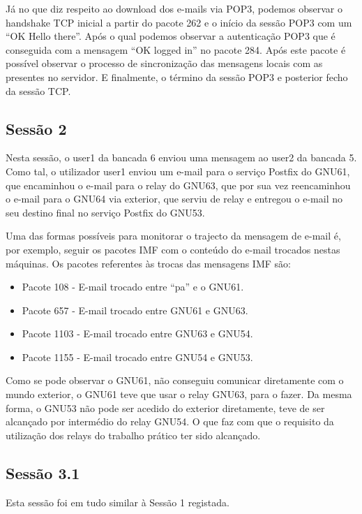 \documentclass[a4paper,12pt]{article}
\begin{document}
Já no que diz respeito ao download dos e-mails via POP3, podemos observar
o handshake TCP inicial a partir do pacote 262 e o início da sessão POP3
com um ``OK Hello there''. Após o qual podemos observar a autenticação
POP3 que é conseguida com a mensagem ``OK logged in'' no pacote 284. Após este
pacote é possível observar o processo de sincronização das mensagens
locais com as presentes no servidor. E finalmente, o término da sessão POP3
e posterior fecho da sessão TCP.

\subsection{Sessão 2}

Nesta sessão, o user1 da bancada 6 enviou uma mensagem ao user2 da bancada 5.
Como tal, o utilizador user1 enviou um e-mail para o serviço Postfix do
GNU61, que encaminhou o e-mail para o relay do GNU63,
que por sua vez reencaminhou o e-mail para o GNU64 via exterior, que serviu de relay
e entregou o e-mail no seu destino final no serviço Postfix do GNU53.

Uma das formas possíveis para monitorar o trajecto da mensagem de e-mail é,
por exemplo, seguir os pacotes IMF com o conteúdo do e-mail trocados nestas 
máquinas. Os pacotes referentes às trocas das mensagens IMF são:
\begin{itemize}
	\item Pacote 108 - E-mail trocado entre ``pa'' e o GNU61.
	\item Pacote 657 - E-mail trocado entre GNU61 e GNU63.
	\item Pacote 1103 - E-mail trocado entre GNU63 e GNU54.
	\item Pacote 1155 - E-mail trocado entre GNU54 e GNU53.
\end{itemize}

Como se pode observar o GNU61, não conseguiu comunicar diretamente com o mundo 
exterior, o GNU61 teve que usar o relay GNU63, para o fazer. Da mesma forma, o
GNU53 não pode ser acedido do exterior diretamente, teve de ser alcançado
por intermédio do relay GNU54. O que faz com que o requisito da utilização
dos relays do trabalho prático ter sido alcançado.

\subsection{Sessão 3.1}

Esta sessão foi em tudo similar à Sessão 1 registada.
\end{document}
